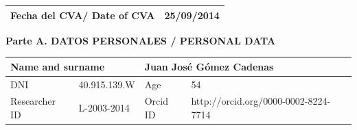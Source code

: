 \documentclass[a4paper,11pt,oneside]{article}
\begin{document}


%


\begin{table}[h!]
\begin{flushright}
\begin{tabular}{|l|c|}
\hline
 \textbf{Fecha del CVA/ Date of CVA} & 25/09/2014\\
\hline
\end{tabular}
\label{tab:DATE}
\end{flushright}
\end{table} 
 \noindent\textbf{Parte A. DATOS PERSONALES / PERSONAL DATA}
\begin{table}[h!]
\begin{flushleft}
\begin{tabular}{| l | l | l | l |}
\hline
\multicolumn{2}{|l|}{Name and surname } & \multicolumn{2}{|l|}{ Juan José Gómez Cadenas}\\
\hline
DNI & 40.915.139.W & Age & 54 \\
\hline
Researcher ID &  L-2003-2014 &  Orcid ID &  http://orcid.org/0000-0002-8224-7714 \\
\hline
\end{tabular}
\label{tab:personal}
\end{flushleft}
\end{table} 
\end{document}
